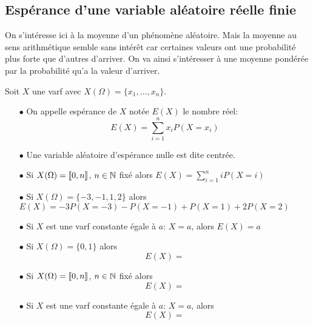 \documentclass[a4paper, 11pt]{article}
\begin{document}
\subsection{Esp\'erance d'une variable al\'eatoire r\'eelle finie}

 On s'int\'eresse ici \`a la moyenne d'un ph\'enom\`ene al\'eatoire. Mais la moyenne au sens arithm\'etique semble sans int\'er\^et car certaines valeurs ont une probabilit\'e plus forte que d'autres d'arriver. On va ainsi s'int\'eresser \`a une moyenne pond\'er\'ee par la probabilit\'e qu'a la valeur d'arriver.



 {  

\begin{defi} 
Soit $X$ une varf avec $X(\Omega)=\lbrace x_1,\dots, x_n\rbrace$. \vsec
\begin{itemize}
\item[$\bullet$] On appelle esp\'erance de $X$ not\'ee $E(X)$  le nombre r\'eel:
$$E(X) =\sum_{i=1}^n x_i P(X=x_i)$$
\item[$\bullet$] Une variable al\'eatoire d'esp\'erance nulle est dite centrée.
\end{itemize}
\end{defi}
 
}


\begin{exemples}
\begin{itemize}
\item[$\bullet$] Si $X(\Omega)=\llbracket 0,n\rrbracket$, $n\in\mathbb{N}$ fix\'e alors $E(X)=\sum_{i=1}^n i P(X=i)$
\item[$\bullet$] Si $X(\Omega)=\lbrace -3,-1,1,2\rbrace$ alors $E(X)=-3 P(X=-3) -P(X=-1) +P(X=1)+2P(X=2)$
\item[$\bullet$] Si $X$ est une varf constante \'egale \`{a} $a$: $X=a$, alors $E(X)=a$
\end{itemize}


\begin{itemize}
\item[$\bullet$] Si $X(\Omega)=\lbrace 0,1\rbrace$ alors $$E(X)= $$
\item[$\bullet$] Si $X(\Omega)=\llbracket 0,n\rrbracket$, $n\in\mathbb{N}$ fix\'e alors $$E(X)= $$
\item[$\bullet$] Si $X$ est une varf constante \'egale \`{a} $a$: $X=a$, alors $$E(X)= $$
\end{itemize}
\end{exemples}
\end{document}
